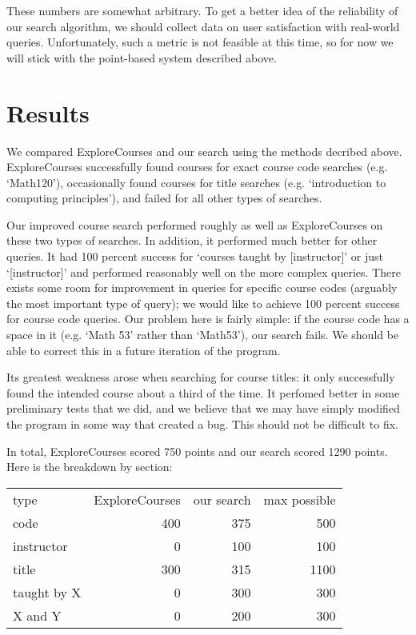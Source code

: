 \documentclass[12pt]{article}
\begin{document}
These numbers are somewhat arbitrary. To get a better idea of the
reliability of our search algorithm, we should collect data on user
satisfaction with real-world queries. Unfortunately, such a metric is
not feasible at this time, so for now we will stick with the
point-based system described above.

\section*{Results}

We compared ExploreCourses and our search using the methods decribed
above. ExploreCourses successfully found courses for exact course code
searches (e.g. `Math120'), occasionally found courses for title
searches (e.g. `introduction to computing principles'), and failed for
all other types of searches.

Our improved course search performed roughly as well as ExploreCourses
on these two types of searches. In addition, it performed much better
for other queries. It had 100 percent success for `courses taught by
[instructor]' or just `[instructor]' and performed reasonably well on
the more complex queries. There exists some room for improvement in
queries for specific course codes (arguably the most important type of
query); we would like to achieve 100 percent success for course code
queries. Our problem here is fairly simple: if the course code has a
space in it (e.g. `Math 53' rather than `Math53'), our search
fails. We should be able to correct this in a future iteration of the
program.

Its greatest weakness arose when searching for course titles: it only
successfully found the intended course about a third of the time. It
perfomed better in some preliminary tests that we did, and we believe
that we may have simply modified the program in some way that created
a bug. This should not be difficult to fix.

In total, ExploreCourses scored 750 points and our search scored 1290
points. Here is the breakdown by section: 

\begin{tabular}{l r r r}
type & ExploreCourses & our search & max possible \\
code & 400 & 375 & 500\\
instructor & 0 & 100 & 100 \\
title & 300 & 315 & 1100 \\
taught by X & 0 & 300 & 300 \\
X and Y & 0 & 200 & 300 \\
\end{tabular}
	
\end{document}

